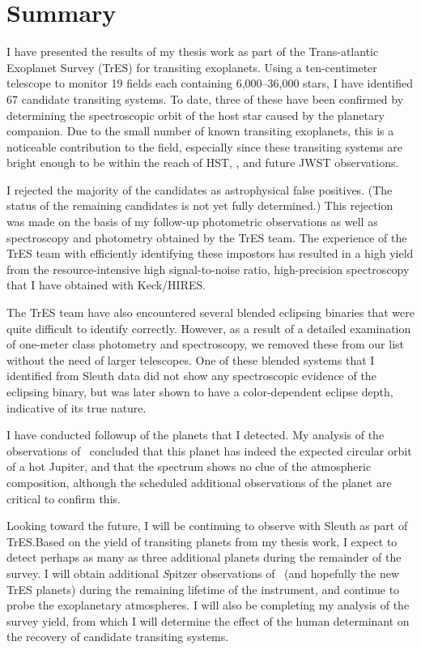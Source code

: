 \chapter[Summary]{Summary}\label{cha:discuss}

I have presented the results of my thesis work as part of the Trans-atlantic Exoplanet Survey (TrES) for transiting
exoplanets.  Using a ten-centimeter telescope to monitor 19 fields each containing 6,000--36,000 stars, I have
identified 67 candidate transiting systems.  To date, three of these have been confirmed by determining the
spectroscopic orbit of the host star caused by the planetary companion.  Due to the small number of known transiting
exoplanets, this is a noticeable contribution to the field, especially since these transiting systems are bright enough
to be within the reach of HST, {\spi}, and future JWST observations.

I rejected the majority of the candidates as astrophysical false positives.  (The status of the remaining candidates is
not yet fully determined.) This rejection was made on the basis of my follow-up photometric observations as well as
spectroscopy and photometry obtained by the TrES team.  The experience of the TrES team with efficiently identifying
these impostors has resulted in a high yield from the resource-intensive high signal-to-noise ratio, high-precision
spectroscopy that I have obtained with Keck/HIRES.\@

The TrES team have also encountered several blended eclipsing binaries that were quite difficult to identify correctly.
However, as a result of a detailed examination of one-meter class photometry and spectroscopy, we removed these from our
list without the need of larger telescopes.  One of these blended systems that I identified from Sleuth data did not
show any spectroscopic evidence of the eclipsing binary, but was later shown to have a color-dependent eclipse depth,
indicative of its true nature.

I have conducted followup of the planets that I detected.  My analysis of the {\spi} observations of \tresTwo\ concluded
that this planet has indeed the expected circular orbit of a hot Jupiter, and that the spectrum shows no clue of the
atmospheric composition, although the scheduled additional observations of the planet are critical to confirm this.

Looking toward the future, I will be continuing to observe with Sleuth as part of TrES.\@  Based on the yield of
transiting planets from my thesis work, I expect to detect perhaps as many as three additional planets during the
remainder of the survey.  I will obtain additional {\textit Spitzer} observations of \tresTwo\ (and hopefully the new
TrES planets) during the remaining lifetime of the instrument, and continue to probe the exoplanetary atmospheres.  I
will also be completing my analysis of the survey yield, from which I will determine the effect of the human determinant
on the recovery of candidate transiting systems.
